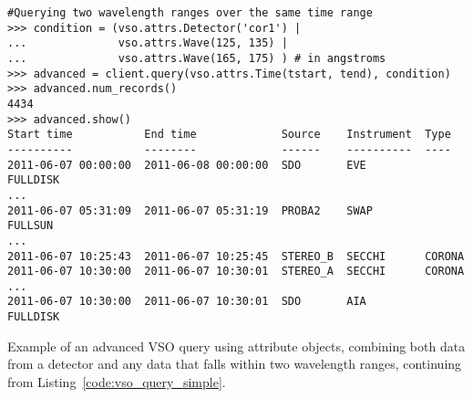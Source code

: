 \begin{listing}[H]
\begin{verbatim}
#Querying two wavelength ranges over the same time range
>>> condition = (vso.attrs.Detector('cor1') |
...              vso.attrs.Wave(125, 135) |
...              vso.attrs.Wave(165, 175) ) # in angstroms
>>> advanced = client.query(vso.attrs.Time(tstart, tend), condition)
>>> advanced.num_records()
4434
>>> advanced.show()
Start time           End time             Source    Instrument  Type
----------           --------             ------    ----------  ----
2011-06-07 00:00:00  2011-06-08 00:00:00  SDO       EVE         FULLDISK
...
2011-06-07 05:31:09  2011-06-07 05:31:19  PROBA2    SWAP        FULLSUN
...
2011-06-07 10:25:43  2011-06-07 10:25:45  STEREO_B  SECCHI      CORONA
2011-06-07 10:30:00  2011-06-07 10:30:01  STEREO_A  SECCHI      CORONA
...
2011-06-07 10:30:00  2011-06-07 10:30:01  SDO       AIA         FULLDISK
\end{verbatim}
\caption{Example of an advanced VSO query using attribute objects,
combining both data from a detector and any data that falls within two wavelength ranges,
continuing from Listing~\ref{code:vso_query_simple}.}
\label{code:vso_query_advanced}
\end{listing}
